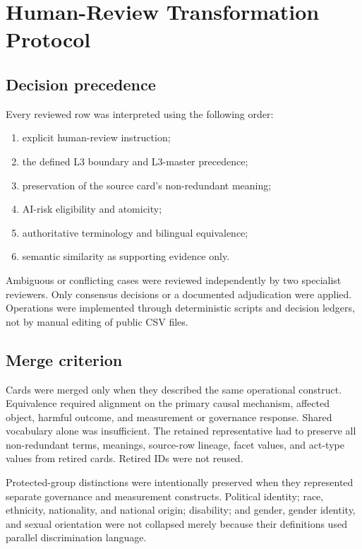 \documentclass[10pt,a4paper]{article}
\begin{document}
\section{Human-Review Transformation Protocol}

\subsection{Decision precedence}

Every reviewed row was interpreted using the following order:

\begin{enumerate}
\item explicit human-review instruction;
\item the defined L3 boundary and L3-master precedence;
\item preservation of the source card's non-redundant meaning;
\item AI-risk eligibility and atomicity;
\item authoritative terminology and bilingual equivalence;
\item semantic similarity as supporting evidence only.
\end{enumerate}

Ambiguous or conflicting cases were reviewed independently by two specialist reviewers. Only consensus decisions or a documented adjudication were applied. Operations were implemented through deterministic scripts and decision ledgers, not by manual editing of public CSV files.

\subsection{Merge criterion}

Cards were merged only when they described the same operational construct. Equivalence required alignment on the primary causal mechanism, affected object, harmful outcome, and measurement or governance response. Shared vocabulary alone was insufficient. The retained representative had to preserve all non-redundant terms, meanings, source-row lineage, facet values, and act-type values from retired cards. Retired IDs were not reused.

Protected-group distinctions were intentionally preserved when they represented separate governance and measurement constructs. Political identity; race, ethnicity, nationality, and national origin; disability; and gender, gender identity, and sexual orientation were not collapsed merely because their definitions used parallel discrimination language.
\end{document}
